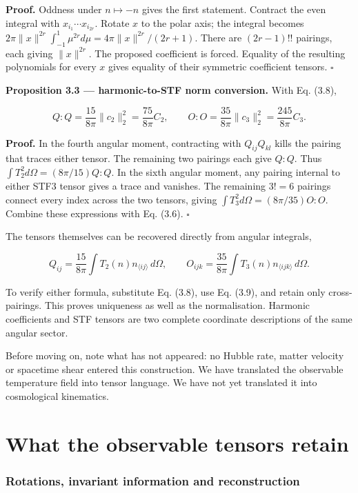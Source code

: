 \documentclass[
  11pt,
  a4paper]{article}
\begin{document}
\textbf{Proof.} Oddness under \(n\mapsto-n\) gives the first statement. Contract the even integral with \(x_{i_1}\cdots x_{i_{2r}}\). Rotate \(x\) to the polar axis; the integral becomes
\(2\pi\|x\|^{2r}\int_{-1}^1\mu^{2r}d\mu=4\pi\|x\|^{2r}/(2r+1)\).
There are \((2r-1)!!\) pairings, each giving \(\|x\|^{2r}\). The proposed coefficient is forced. Equality of the resulting polynomials for every \(x\) gives equality of their symmetric coefficient tensors. \(\square\)

\textbf{Proposition 3.3 --- harmonic-to-STF norm conversion.} With Eq. (3.8),

\[
\boxed{Q:Q=\frac{15}{8\pi}\|c_2\|_2^2
=\frac{75}{8\pi}C_2},\qquad
\boxed{O:O=\frac{35}{8\pi}\|c_3\|_2^2
=\frac{245}{8\pi}C_3}.
\tag{3.10}
\]

\textbf{Proof.} In the fourth angular moment, contracting with \(Q_{ij}Q_{kl}\) kills the pairing that traces either tensor. The remaining two pairings each give \(Q:Q\). Thus \(\int T_2^2d\Omega=(8\pi/15)Q:Q\). In the sixth angular moment, any pairing internal to either STF3 tensor gives a trace and vanishes. The remaining \(3!=6\) pairings connect every index across the two tensors, giving \(\int T_3^2d\Omega=(8\pi/35)O:O\). Combine these expressions with Eq. (3.6). \(\square\)

The tensors themselves can be recovered directly from angular integrals,

\[
Q_{ij}=\frac{15}{8\pi}\int T_2(n)n_{\langle ij\rangle}\,d\Omega,
\qquad
O_{ijk}=\frac{35}{8\pi}\int T_3(n)n_{\langle ijk\rangle}\,d\Omega.
\tag{3.11}
\]

To verify either formula, substitute Eq. (3.8), use Eq. (3.9), and retain only cross-pairings. This proves uniqueness as well as the normalisation. Harmonic coefficients and STF tensors are two complete coordinate descriptions of the same angular sector.

Before moving on, note what has not appeared: no Hubble rate, matter velocity or spacetime shear entered this construction. We have translated the observable temperature field into tensor language. We have not yet translated it into cosmological kinematics.

\clearpage
\part{What the observable tensors retain}

\hypertarget{rotations-invariant-information-and-reconstruction}{%
\section{Rotations, invariant information and reconstruction}\label{rotations-invariant-information-and-reconstruction}}
\end{document}
